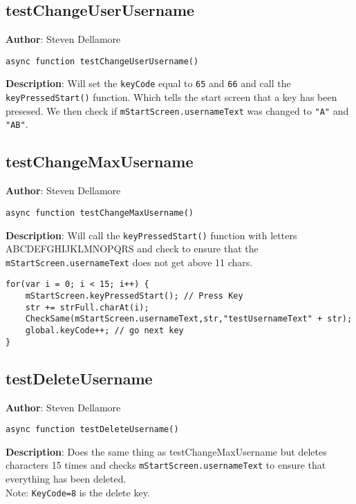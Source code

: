 \documentclass[12pt]{article}
\begin{document}
\subsection{testChangeUserUsername}
\textbf{Author}: Steven Dellamore 
\vspace*{1\baselineskip}
\begin{lstlisting}
async function testChangeUserUsername()
\end{lstlisting} 
\vspace*{1\baselineskip}
\textbf{Description}: Will set the \texttt{keyCode} equal to \texttt{65} and \texttt{66} and call the \texttt{keyPressedStart()} function. Which tells the start screen that a key has been presesed. We then check if \texttt{mStartScreen.usernameText} was changed to \texttt{"A"} and \texttt{"AB"}. 



\subsection{testChangeMaxUsername}
\textbf{Author}: Steven Dellamore 
\vspace*{1\baselineskip}
\begin{lstlisting}
async function testChangeMaxUsername()
\end{lstlisting} 
\vspace*{1\baselineskip}
\textbf{Description}: Will call the \texttt{keyPressedStart()} function with letters ABCDEFGHIJKLMNOPQRS and check to ensure that the \texttt{mStartScreen.usernameText} does not get above 11 chars. 
\begin{verbatim}
for(var i = 0; i < 15; i++) {
    mStartScreen.keyPressedStart(); // Press Key
    str += strFull.charAt(i);
    CheckSame(mStartScreen.usernameText,str,"testUsernameText" + str);
    global.keyCode++; // go next key
}
\end{verbatim}
 



\subsection{testDeleteUsername}
\textbf{Author}: Steven Dellamore 
\vspace*{1\baselineskip}
\begin{lstlisting}
async function testDeleteUsername()
\end{lstlisting} 
\vspace*{1\baselineskip}
\textbf{Description}: Does the same thing as testChangeMaxUsername but deletes characters 15 times and checks \texttt{mStartScreen.usernameText} to ensure that everything has been deleted. \\Note: \texttt{KeyCode=8} is the delete key. 
\end{document}
